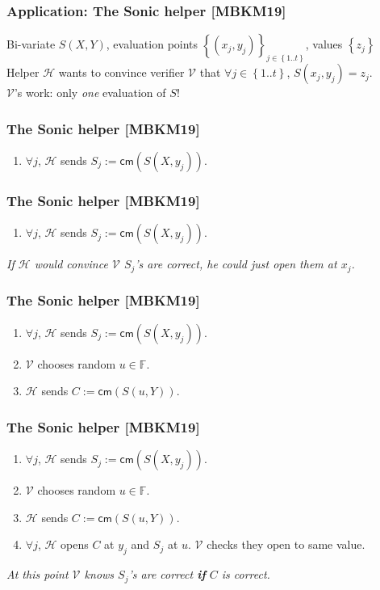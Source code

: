 \documentclass[shadesubsections,trans,14pt,mathserif]{beamer}
\newcommand{\F}{\ensuremath{\mathbb F}}
\newcommand{\set}[1]{\ensuremath{\left\{#1\right\}}}
\newcommand{\sett}[2]{\ensuremath{\left\{#1\right\}_{#2}}}
\newcommand{\cm}{\ensuremath{\mathsf{cm}}}
\newcommand{\defeq}{\ensuremath{:=}}
\newcommand{\helper}{\ensuremath{\mathcal{H}}}
\newcommand{\ver}{\ensuremath{\mathcal{V}}}
\begin{document}
\begin{frame}
  \frametitle{Application: The Sonic helper \small{[MBKM19]}}
 Bi-variate $S(X,Y)$, evaluation points \sett{(x_j,y_j)}{j\in \set{1..t}}, values \set{z_j} \\
 \vspace{0.4in}
 Helper $\helper$ wants to convince verifier $\ver$ that $\forall j\in \set{1..t}$, $S(x_j,y_j)=z_j$.\\
 \vspace{0.4in}
$\ver$'s work: only \emph{one} evaluation of $S$!
 \end{frame}

 
\begin{frame}
  \frametitle{The Sonic helper \small{[MBKM19]}}
 \begin{enumerate}
  \item $\forall j$, $\helper$ sends $S_j \defeq \cm(S(X,y_j))$.
 \end{enumerate}
 
 \end{frame}
\begin{frame}
  \frametitle{The Sonic helper \small{[MBKM19]}}
 \begin{enumerate}
  \item $\forall j$, $\helper$ sends $S_j \defeq \cm(S(X,y_j))$.
 \end{enumerate}
 \vspace{0.4in}
\emph{If $\helper$ would convince $\ver$ $S_j$'s are correct, he could just open them at $x_j$. } 
 \end{frame}

\begin{frame}
  \frametitle{The Sonic helper \small{[MBKM19]}}
 \begin{enumerate}
  \item $\forall j$, $\helper$ sends $S_j \defeq \cm(S(X,y_j))$.
\item $\ver$ chooses random $u\in \F$.
\item $\helper$ sends $C\defeq \cm(S(u,Y))$.

  \end{enumerate}
 \vspace{0.4in}
 \end{frame}

 
 \begin{frame}
  \frametitle{The Sonic helper \small{[MBKM19]}}
 \begin{enumerate}
  \item $\forall j$, $\helper$ sends $S_j \defeq \cm(S(X,y_j))$.
\item $\ver$ chooses random $u\in \F$.
\item $\helper$ sends $C\defeq \cm(S(u,Y))$.
\item $\forall j$, $\helper$ opens $C$ at $y_j$ and $S_j$ at $u$. $\ver$ checks they open to same value.
  \end{enumerate}
 \vspace{0.4in}
\emph{At this point $\ver$ knows $S_j$'s are correct \textbf{if} $C$ is correct.}
 \end{frame}
\end{document}
